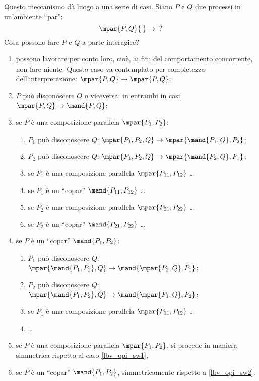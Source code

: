 \documentclass[12pt,a4paper,openright,twoside]{report}
\begin{document}
Questo meccanismo d\`a luogo a una serie di casi. Siano $P$ e $Q$ due processi in un'ambiente ``par'':
$$
	\mpar{P, Q}{\;}\rightarrow{\;}?
$$
Cosa possono fare $P$ e $Q$ a parte interagire?
\begin{enumerate}[label=\arabic*.]
	\item possono lavorare per conto loro, cio\`e, ai fini del comportamento concorrente, non fare niente. Questo caso va contemplato per completezza dell'interpretazione: $\mpar{P, Q} \rightarrow \mpar{P, Q}$;
	\item $P$ pu\`o disconoscere $Q$ o viceversa: in entrambi in casi $\mpar{P, Q} \rightarrow \mand{P,Q}$;
	\item\label{lbv_opi_sw1} se $P$ \`e una composizione parallela $\mpar{P_1, P_2}$:
	\begin{enumerate}[label=\arabic{enumi}.\arabic*.]
		\item $P_1$ pu\`o disconoscere $Q$: $\mpar{P_1, P_2, Q} \rightarrow \mpar{\mand{P_1,Q}, P_2}$;
		\item $P_2$ pu\`o disconoscere $Q$: $\mpar{P_1, P_2, Q} \rightarrow \mpar{\mand{P_2,Q}, P_1}$;
		\item se $P_1$ \`e una composizione parallela $\mpar{P_{11}, P_{12}}$ \ldots
		\item se $P_1$ \`e un ``copar'' $\mand{P_{11}, P_{12}}$ \ldots
		\item se $P_2$ \`e una composizione parallela $\mpar{P_{21}, P_{22}}$ \ldots
		\item se $P_2$ \`e un ``copar'' $\mand{P_{21}, P_{22}}$ \ldots
	\end{enumerate}
	\item\label{lbv_opi_sw2} se $P$ \`e un ``copar'' $\mand{P_1, P_2}$:
	\begin{enumerate}[label=\arabic{enumi}.\arabic*.]
		\item $P_1$ pu\`o disconoscere $Q$: $\mpar{\mand{P_1, P_2}, Q} \rightarrow \mand{\mpar{P_2, Q}, P_1}$;
		\item $P_2$ pu\`o disconoscere $Q$: $\mpar{\mand{P_1, P_2}, Q} \rightarrow \mand{\mpar{P_1, Q}, P_2}$;
		\item se $P_1$ \`e una composizione parallela $\mpar{P_{11}, P_{12}}$ \ldots
		\item \ldots
	\end{enumerate}
	\item se $P$ \`e una composizione parallela $\mpar{P_1, P_2}$, si procede in maniera simmetrica rispetto al caso \ref{lbv_opi_sw1};
	\item se $P$ \`e un ``copar'' $\mand{P_1, P_2}$, simmetricamente rispetto a \ref{lbv_opi_sw2}.
\end{enumerate}
\end{document}
